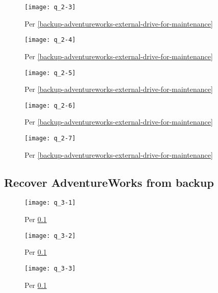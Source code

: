 \begin{figure}[H]\centering
	\caption{Per \ref{backup-adventureworks-external-drive-for-maintenance}}
	\texttt{[image: q\_2-3]}
	\label{fig:q_2-3}
\end{figure}

\begin{figure}[H]\centering
	\caption{Per \ref{backup-adventureworks-external-drive-for-maintenance}}
	\texttt{[image: q\_2-4]}
	\label{fig:q_2-4}
\end{figure}

\begin{figure}[H]\centering
	\caption{Per \ref{backup-adventureworks-external-drive-for-maintenance}}
	\texttt{[image: q\_2-5]}
	\label{fig:q_2-5}
\end{figure}

\begin{figure}[H]\centering
	\caption{Per \ref{backup-adventureworks-external-drive-for-maintenance}}
	\texttt{[image: q\_2-6]}
	\label{fig:q_2-6}
\end{figure}

\begin{figure}[H]\centering
	\caption{Per \ref{backup-adventureworks-external-drive-for-maintenance}}
	\texttt{[image: q\_2-7]}
	\label{fig:q_2-7}
\end{figure}


\hypertarget{recover-adventureworks-from-backup}{%
\subsection{Recover AdventureWorks from
backup}\label{recover-adventureworks-from-backup}}

\begin{figure}[H]\centering
	\caption{Per \ref{recover-adventureworks-from-backup}}
	\texttt{[image: q\_3-1]}
	\label{fig:q_3-1}
\end{figure}

\begin{figure}[H]\centering
	\caption{Per \ref{recover-adventureworks-from-backup}}
	\texttt{[image: q\_3-2]}
	\label{fig:q_3-2}
\end{figure}

\begin{figure}[H]\centering
	\caption{Per \ref{recover-adventureworks-from-backup}}
	\texttt{[image: q\_3-3]}
	\label{fig:q_3-3}
\end{figure}


